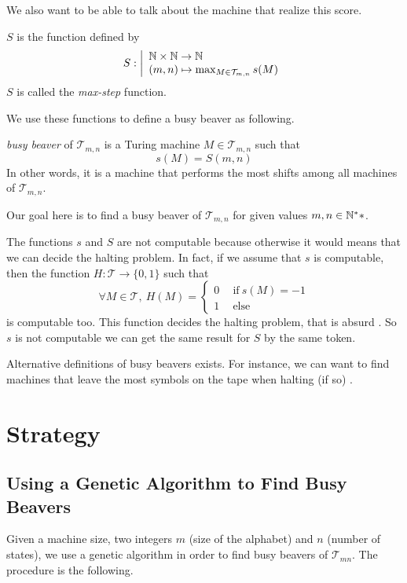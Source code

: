 \documentclass{report}
\begin{document}
We also want to be able to talk about the machine that realize this score.
\begin{Def}
$S$ is the function defined by
\[
S : \left |
  \begin{array}{l}
    \mathbb{N} \times \mathbb{N} \to \mathbb{N}\\
    (m,n) \mapsto \max_{M \in \mathcal{T}_{m,n}} s(M)
  \end{array}
\right .
\]
$S$ is called the \emph{max-step} function.
\end{Def}

We use these functions to define a busy beaver as following.

\begin{Def}
\emph{busy beaver} of $\mathcal{T}_{m,n}$ is a Turing machine $M \in \mathcal{T}_{m,n}$ such that \[s(M) = S(m,n)\] In other words, it is a machine that performs the most shifts among all machines of $\mathcal{T}_{m,n}$. 
\end{Def}


Our goal here is to find a busy beaver of $\mathcal{T}_{m,n}$ for given values $m,n\in\mathbb{N}^**$.


\begin{Rem}
  The functions $s$ and $S$ are not computable because otherwise it would means that we can decide the halting problem. In fact, if we assume that $s$ is computable, then the function $H : \mathcal{T} \to \{0,1\}$ such that
  \[
  \forall M \in \mathcal{T},\ H(M) =
  \left \{
    \begin{array}{l}
      0\quad \ \text{if}\ s(M) = -1\\
      1\quad \ \text{else}
    \end{array}
  \right .
  \]
  is computable too. This function decides the halting problem, that is absurd \cite{turing}. So $s$ is not computable we can get the same result for $S$ by the same token.
\end{Rem}

\begin{Rem}
  Alternative definitions of busy beavers exists. For instance, we can want to find machines that leave the most symbols on the tape when halting (if so) \cite{rado}.
\end{Rem}

\chapter{Strategy}
\label{chap:strategy}

\section{Using a Genetic Algorithm to Find Busy Beavers}
\label{sec:genalg}
Given a machine size, \ie two integers $m$ (size of the alphabet) and $n$ (number of states), we use a genetic algorithm in order to find busy beavers of $\mathcal{T}_{mn}$. The procedure is the following.
\end{document}
